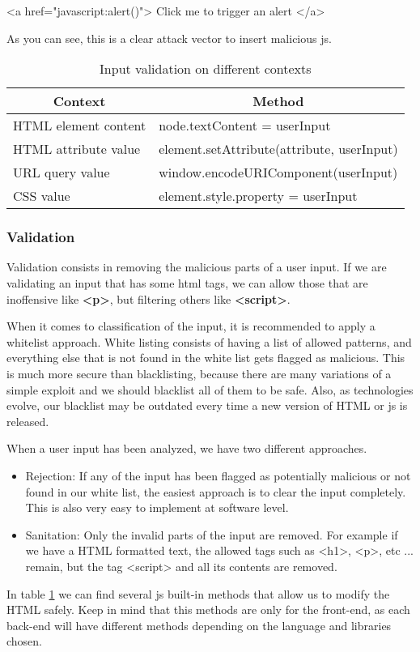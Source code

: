 \begin{html}
  <a href="javascript:alert()"> Click me to trigger an alert </a>
\end{html}

As you can see, this is a clear attack vector to insert malicious js.

\begin{table}[]
  \centering
  \caption{Input validation on different contexts}
  \label{input-validation}
  \begin{tabular}{|l|l|}
    \hline
    \multicolumn{1}{|c|}{\textbf{Context}} & \multicolumn{1}{c|}{\textbf{Method}}                           \\ \hline
    HTML element content                   & node.textContent = userInput 									\\ \hline
    HTML attribute value                   & element.setAttribute(attribute, userInput)                   	\\ \hline
    URL query value                        & window.encodeURIComponent(userInput)                           \\ \hline
    CSS value                              & element.style.property = userInput                             \\ \hline
  \end{tabular}
\end{table}

\subsubsection{Validation}
Validation consists in removing the malicious parts of a user input. If we are validating an input that has some html tags, we can allow those that are inoffensive like \textbf{<p>}, but filtering others like \textbf{<script>}. 

When it comes to classification of the input, it is recommended to apply a whitelist approach. White listing consists of having a list of allowed patterns, and everything else that is not found in the white list gets flagged as malicious. This is much more secure than blacklisting, because there are many variations of a simple exploit and we should blacklist all of them to be safe. Also, as technologies evolve, our blacklist may be outdated every time a new version of HTML or js is released. 

When a user input has been analyzed, we have two different approaches.

\begin{itemize}
\item Rejection: If any of the input has been flagged as potentially malicious or not found in our white list, the easiest approach is to clear the input completely. This is also very easy to implement at software level. 

\item Sanitation: Only the invalid parts of the input are removed. For example if we have a HTML formatted text, the allowed tags such as <h1>, <p>, etc ...  remain, but the tag <script> and all its contents are removed.
\end{itemize}

In table \ref{input-validation} we can find several js built-in methods that allow us to modify the HTML safely. Keep in mind that this methods are only for the front-end, as each back-end will have different methods depending on the language and libraries chosen.